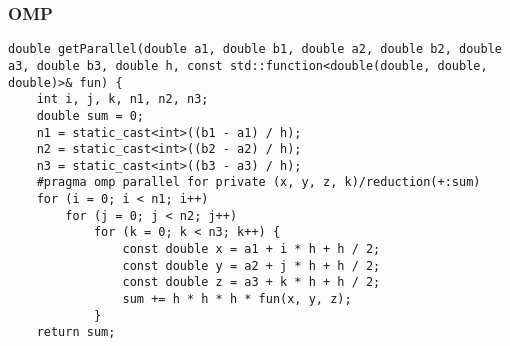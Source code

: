 \documentclass[14pt, a4paper]{extarticle}
\begin{document}
  \subsubsection{OMP}
  \begin{lstlisting}
double getParallel(double a1, double b1, double a2, double b2, double a3, double b3, double h, const std::function<double(double, double, double)>& fun) {
    int i, j, k, n1, n2, n3;
    double sum = 0;
    n1 = static_cast<int>((b1 - a1) / h);
    n2 = static_cast<int>((b2 - a2) / h);
    n3 = static_cast<int>((b3 - a3) / h);
    #pragma omp parallel for private (x, y, z, k)/reduction(+:sum)
    for (i = 0; i < n1; i++)
        for (j = 0; j < n2; j++)
            for (k = 0; k < n3; k++) {
                const double x = a1 + i * h + h / 2;
                const double y = a2 + j * h + h / 2;
                const double z = a3 + k * h + h / 2;
                sum += h * h * h * fun(x, y, z);
            }
    return sum;
  \end{lstlisting}
  \newpage
\end{document}
